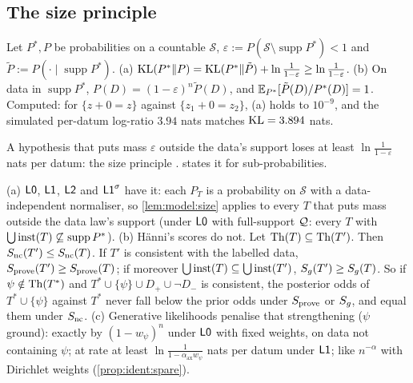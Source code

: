 \subsection{The size principle}\label{sec:model:size}

\begin{lemma}\label{lem:model:size}
Let $P^*,P$ be probabilities on a countable $\mathcal S$, $\varepsilon:=P(\mathcal S\setminus\operatorname{supp}P^*)<1$ and $\tilde P:=P(\cdot\mid\operatorname{supp}P^*)$.
(a) $\mathrm{KL}(P^*\|P)=\mathrm{KL}(P^*\|\tilde P)+\ln\frac1{1-\varepsilon}\ge\ln\frac1{1-\varepsilon}$.
(b) On data in $\operatorname{supp}P^*$, $P(D)=(1-\varepsilon)^n\tilde P(D)$, and $\mathbb{E}_{P^*}[\tilde P(D)/P^*(D)]=1$.
Computed: for $\{z+0=z\}$ against $\{z_1+0=z_2\}$, (a) holds to $10^{-9}$, and the simulated per-datum log-ratio $3.94$ nats matches $\mathrm{KL}=3.894$ nats.
\end{lemma}

A hypothesis that puts mass $\varepsilon$ outside the data's support loses at least $\ln\frac1{1-\varepsilon}$ nats per datum: the size principle \citep{tenenbaum2001generalization}.  states it for sub-probabilities.

\begin{proposition}\label{prop:model:whichsize}
(a) $\mathord{\mathsf{L0}}$, $\mathord{\mathsf{L1}}$, $\mathord{\mathsf{L2}}$ and $\mathord{\mathsf{L1}}^{\sigma}$ have it: each $P_T$ is a probability on $\mathcal S$ with a data-independent normaliser, so \cref{lem:model:size} applies to every $T$ that puts mass outside the data law's support (under $\mathord{\mathsf{L0}}$ with full-support $\mathcal{Q}$: every $T$ with $\bigcup\mathrm{inst}(T)\not\subseteq\operatorname{supp}P^*$).
(b) H\"anni's scores do not. Let $\mathrm{Th}(T)\subseteq\mathrm{Th}(T')$. Then $S_{\mathrm{nc}}(T')\le S_{\mathrm{nc}}(T)$. If $T'$ is consistent with the labelled data, $S_{\mathrm{prove}}(T')\ge S_{\mathrm{prove}}(T)$; if moreover $\bigcup\mathrm{inst}(T)\subseteq\bigcup\mathrm{inst}(T')$, $S_{g}(T')\ge S_{g}(T)$. So if $\psi\notin\mathrm{Th}(T^*)$ and $T^*\cup\{\psi\}\cup D_+\cup\neg D_-$ is consistent, the posterior odds of $T^*\cup\{\psi\}$ against $T^*$ never fall below the prior odds under $S_{\mathrm{prove}}$ or $S_{g}$, and equal them under $S_{\mathrm{nc}}$.
(c) Generative likelihoods penalise that strengthening ($\psi$ ground): exactly by $(1-w_\psi)^n$ under $\mathord{\mathsf{L0}}$ with fixed weights, on data not containing $\psi$; at rate at least $\ln\frac1{1-\alpha_{\mathrm{ax}}w_\psi}$ nats per datum under $\mathord{\mathsf{L1}}$; like $n^{-\alpha}$ with Dirichlet weights (\cref{prop:ident:spare}).
\end{proposition}


